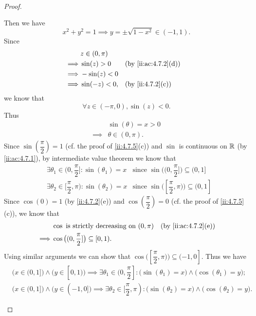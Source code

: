 \begin{proof}
\begin{itemize}
          Then we have
          \[
            x^2 + y^2 = 1 \implies y = \pm \sqrt{1 - x^2} \in (-1, 1).
          \]
          Since
          \begin{align*}
                     & z \in (0, \pi)                          \\
            \implies & \sin(z) > 0    &  & \by{ii:ac:4.7.2}[d] \\
            \implies & -\sin(z) < 0                            \\
            \implies & \sin(-z) < 0,  &  & \by{ii:4.7.2}[c]
          \end{align*}
          we know that
          \[
            \forall z \in (-\pi, 0), \sin(z) < 0.
          \]
          Thus
          \begin{align*}
                     & \sin(\theta) = x > 0 \\
            \implies & \theta \in (0, \pi).
          \end{align*}
          Since \(\sin(\dfrac{\pi}{2}) = 1\) (cf. the proof of \cref{ii:4.7.5}(c)) and \(\sin\) is continuous on \(\mathbb{R}\) (by \cref{ii:ac:4.7.1}), by intermediate value theorem we know that
          \begin{align*}
             & \exists \theta_1 \in (0, \dfrac{\pi}{2}] : \sin(\theta_1) = x   & \text{since } \sin\big((0, \dfrac{\pi}{2}]\big) \subseteq (0, 1]   \\
             & \exists \theta_2 \in [\dfrac{\pi}{2}, \pi) : \sin(\theta_2) = x & \text{since } \sin\big([\dfrac{\pi}{2}, \pi)\big) \subseteq (0, 1]
          \end{align*}
          Since \(\cos(0) = 1\) (by \cref{ii:4.7.2}(e)) and \(\cos(\dfrac{\pi}{2}) = 0\) (cf. the proof of \cref{ii:4.7.5}(c)), we know that
          \begin{align*}
                     & \cos \text{ is strictly decreasing on } (0, \pi)    &  & \by{ii:ac:4.7.2}[e] \\
            \implies & \cos\big((0, \dfrac{\pi}{2}]\big) \subseteq [0, 1).
          \end{align*}
          Using similar arguments we can show that \(\cos\big([\dfrac{\pi}{2}, \pi)\big) \subseteq (-1, 0]\).
          Thus we have
          \begin{align*}
             & \big(x \in (0, 1]\big) \land \big(y \in [0, 1)\big) \implies \exists \theta_1 \in (0, \dfrac{\pi}{2}] : \big(\sin(\theta_1) = x\big) \land \big(\cos(\theta_1) = y\big);    \\
             & \big(x \in (0, 1]\big) \land \big(y \in (-1, 0]\big) \implies \exists \theta_2 \in [\dfrac{\pi}{2}, \pi) : \big(\sin(\theta_2) = x\big) \land \big(\cos(\theta_2) = y\big).

\end{align*}
\end{itemize}
\end{proof}
